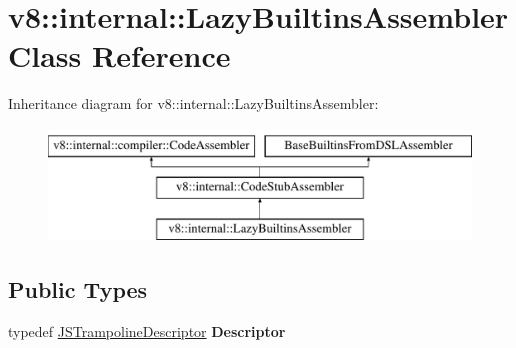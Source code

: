 \hypertarget{classv8_1_1internal_1_1LazyBuiltinsAssembler}{}\section{v8\+:\+:internal\+:\+:Lazy\+Builtins\+Assembler Class Reference}
\label{classv8_1_1internal_1_1LazyBuiltinsAssembler}
Inheritance diagram for v8\+:\+:internal\+:\+:Lazy\+Builtins\+Assembler\+:\begin{figure}[H]
\begin{center}
\leavevmode
\includegraphics[height=3.000000cm]{classv8_1_1internal_1_1LazyBuiltinsAssembler}
\end{center}
\end{figure}
\subsection*{Public Types}
\begin{DoxyCompactItemize}
\item 
\mbox{\label{classv8_1_1internal_1_1LazyBuiltinsAssembler_ab7ee37943a1544b8b9223f18cb63bd72}} 
typedef \mbox{\hyperlink{classv8_1_1internal_1_1JSTrampolineDescriptor}{J\+S\+Trampoline\+Descriptor}} {\bfseries Descriptor}
\end{DoxyCompactItemize}
